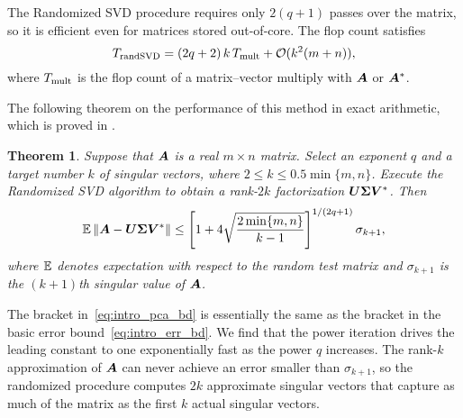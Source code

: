 \documentclass[12pt]{article}
\newtheorem{theorem}{Theorem}
\begin{document}
The Randomized SVD procedure requires %
only $2(q+1)$ passes over the matrix, so it is
efficient even for matrices stored out-of-core.
The flop count satisfies
$$
T_{\rm rand SVD} = (2q+2)\,k \, T_{\rm mult} + \mathcal{O}(k^2 (m + n)),
$$
where $T_{\rm mult}$ is the flop count of a matrix--vector multiply
with $\bm{A}$ or $\bm{A}^*$.


The following theorem on the performance of this method
in exact arithmetic, which is proved in \cite[\S 10]{RM}.

\begin{theorem}
Suppose that $\bm{A}$ is a real $m \times n$ matrix.  Select
an exponent $q$ and a target number $k$ of singular vectors,
where $2 \leq k \leq 0.5 \min\{m,n\}$.
Execute the Randomized SVD algorithm to obtain a rank-$2k$
factorization $\bm{U\Sigma V}^*$.  Then
\begin{equation}
\label{eq:intro_pca_bd}
\operatorname{\mathbb{E}} \left\Vert { \bm{A} - \bm{U\Sigma V}^*} \right\Vert
    \leq \left[ 1 + 4 \sqrt{\frac{2\min\{m,n\}}{k-1}} \right]^{1/(2q+1)} \sigma_{k+1},
\end{equation}
where $\operatorname{\mathbb{E}}$ denotes expectation with respect to the
random test matrix and $\sigma_{k+1}$ is the $(k+1)$th
singular value of $\bm{A}$.
\end{theorem}

\lsp

The bracket in~\eqref{eq:intro_pca_bd} is essentially
the same as the bracket in the basic error bound~\eqref{eq:intro_err_bd}.
We find that the power iteration drives the leading constant to one
exponentially fast as the power $q$ increases.
The rank-$k$ approximation of $\bm{A}$ can never achieve an error
smaller than $\sigma_{k+1}$, so the randomized procedure computes $2k$
approximate singular vectors that capture as much of the matrix
as the first $k$ actual singular vectors.
\end{document}
